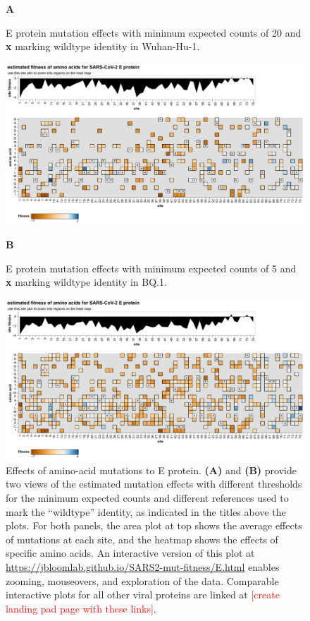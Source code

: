\documentclass[9pt,twocolumn,twoside]{gsajnl_modified}
\newcommand\jdbcomment[1]{\textcolor{red}{[#1]}}
\begin{document}
\begin{figure}
{\bf \Large A}

E protein mutation effects with minimum expected counts of 20 and \textbf{x} marking wildtype identity in Wuhan-Hu-1.

\includegraphics[width=\linewidth, trim={0 0 0 0.4in}, clip=true]{figs/E_view1.pdf}

{\bf \Large B}

E protein mutation effects with minimum expected counts of 5 and \textbf{x} marking wildtype identity in BQ.1.

\includegraphics[width=\linewidth, trim={0 0 0 0.4in}, clip=true]{figs/E_view2.pdf}
\caption{
Effects of amino-acid mutations to E protein.
{\bf (A)} and {\bf (B)} provide two views of the estimated mutation effects with different thresholds for the minimum expected counts and different references used to mark the ``wildtype'' identity, as indicated in the titles above the plots.
For both panels, the area plot at top shows the average effects of mutations at each site, and the heatmap shows the effects of specific amino acids.
An interactive version of this plot at \url{https://jbloomlab.github.io/SARS2-mut-fitness/E.html} enables zooming, mouseovers, and exploration of the data.
Comparable interactive plots for all other viral proteins are linked at \jdbcomment{create landing pad page with these links}.
\label{fig:E}
}
\end{figure}
\end{document}
